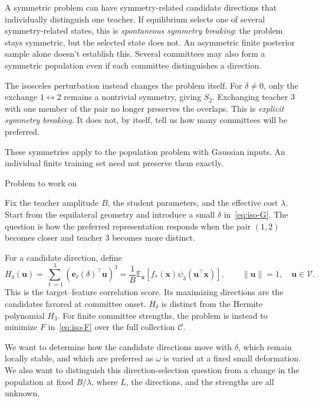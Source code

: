 \documentclass[11pt, reqno]{amsart}
\makeatletter
\def\section{\@startsection{section}{1}%
  \z@{.7\linespacing\@plus\linespacing}{.5\linespacing}%
  {\normalfont\scshape\centering}}
\theoremstyle{notestyle}
\theoremstyle{defstyle}
\makeatother
\begin{document}
A symmetric problem can have symmetry-related candidate directions
that individually distinguish one teacher. If equilibrium selects
one of several symmetry-related states, this is
\emph{spontaneous symmetry breaking}: the problem stays symmetric,
but the selected state does not. An asymmetric finite posterior
sample alone doesn't establish this. Several committees may also
form a symmetric population even if each committee distinguishes a
direction.

The isosceles perturbation instead changes the problem itself.
For $\delta\ne0$, only the exchange $1\leftrightarrow2$ remains a
nontrivial symmetry, giving $S_2$. Exchanging teacher $3$ with one
member of the pair no longer preserves the overlaps. This is
\emph{explicit symmetry breaking}. It does not, by itself, tell us
how many committees will be preferred.

These symmetries apply to the population problem with Gaussian
inputs. An individual finite training set need not preserve them
exactly.

\section{Problem to work on}

Fix the teacher amplitude $B$, the student parameters, and the
effective cost $\lambda$. Start from the equilateral geometry and
introduce a small $\delta$ in~\eqref{eq:iso-G}. The question is how
the preferred representation responds when the pair $(1,2)$ becomes
closer and teacher $3$ becomes more distinct.

For a candidate direction, define
\begin{equation}
 H_\delta(\mathbf u)=
 \sum_{\ell=1}^3(\mathbf e_\ell(\delta)^\top\mathbf u)^3
 =\frac1B\mathbb E_{\mathbf x}
 [f_*(\mathbf x)\psi_3(\mathbf u^\top\mathbf x)],
 \qquad \|\mathbf u\|=1,\quad \mathbf u\in\mathcal V.
\end{equation}
This is the target--feature correlation score. Its maximizing
directions are the candidates favored at committee onset.
$H_\delta$ is distinct from the Hermite polynomial $H_3$.
For finite committee strengths, the problem is instead to minimize
$F$ in~\eqref{eq:iso-F} over the full collection $\mathcal C$.

We want to determine how the candidate directions move with $\delta$,
which remain locally stable, and which are preferred as $\omega$
is varied at a fixed small deformation. We also want to distinguish
this direction-selection question from a change in the population
at fixed $B/\lambda$, where $L$, the directions, and the strengths
are all unknown.
\end{document}

